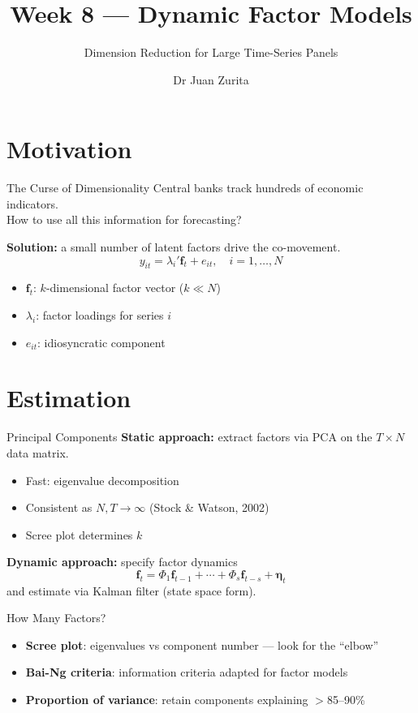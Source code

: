 \documentclass[aspectratio=169, 10pt]{beamer}
\title{Week 8 --- Dynamic Factor Models}
\subtitle{Dimension Reduction for Large Time-Series Panels}
\author{Dr Juan Zurita}
\institute{Economic \& Business Forecasting\\
The University of Edinburgh~$\cdot$~School of Economics}
\date{}
\begin{document}
\maketitle


\section{Motivation}

\begin{frame}{The Curse of Dimensionality}
Central banks track \alert{hundreds} of economic indicators. \\
How to use all this information for forecasting?

\vspace{0.5em}
\textbf{Solution:} a small number of \alert{latent factors} drive the co-movement.
\[
y_{it} = \lambda_i' \mathbf{f}_t + e_{it}, \quad i = 1, \ldots, N
\]
\begin{itemize}
    \item $\mathbf{f}_t$: $k$-dimensional factor vector ($k \ll N$)
    \item $\lambda_i$: factor loadings for series $i$
    \item $e_{it}$: idiosyncratic component
\end{itemize}
\end{frame}

\section{Estimation}

\begin{frame}{Principal Components}
\textbf{Static approach:} extract factors via PCA on the $T \times N$ data matrix.
\begin{itemize}
    \item \alert{Fast}: eigenvalue decomposition
    \item Consistent as $N, T \to \infty$ (Stock \& Watson, 2002)
    \item Scree plot determines $k$
\end{itemize}

\vspace{0.5em}
\textbf{Dynamic approach:} specify factor dynamics
\[
\mathbf{f}_t = \Phi_1 \mathbf{f}_{t-1} + \cdots + \Phi_s \mathbf{f}_{t-s} + \boldsymbol{\eta}_t
\]
and estimate via \alert{Kalman filter} (state space form).
\end{frame}

\begin{frame}{How Many Factors?}
\begin{itemize}
    \item \textbf{Scree plot}: eigenvalues vs component number --- look for the ``elbow''
    \item \textbf{Bai-Ng criteria}: information criteria adapted for factor models
    \item \textbf{Proportion of variance}: retain components explaining $>$85--90\%
\end{itemize}
\end{frame}
\end{document}
